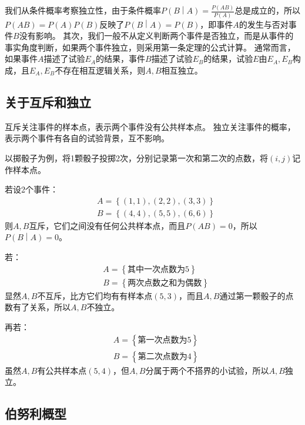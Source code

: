 我们从条件概率考察独立性，由于条件概率$P\left( B \middle| A \right) =\frac{P\left( AB \right)}{P\left( A \right)}$总是成立的，所以$P\left( AB \right) =P\left( A \right) P\left( B \right) $反映了$P\left( B \middle| A \right) =P\left( B \right) $，即事件$A$的发生与否对事件$B$没有影响。
其次，我们一般不从定义判断两个事件是否独立，而是从事件的事实角度判断，如果两个事件独立，则采用第一条定理的公式计算。
通常而言，如果事件$A$描述了试验$E_A$的结果，事件$B$描述了试验$E_B$的结果，试验$E$由$E_A,E_B$构成，且$E_A,E_B$不存在相互逻辑关系，则$A,B$相互独立。

\subsection{关于互斥和独立}

互斥关注事件的样本点，表示两个事件没有公共样本点。
独立关注事件的概率，表示两个事件有各自的试验背景，互不影响。

以掷骰子为例，将1颗骰子投掷2次，分别记录第一次和第二次的点数，将$\left( i,j\right) $记作样本点。

若设2个事件：
\begin{align*}
& A=\left\{ \left( 1,1 \right) ,\left( 2,2 \right) ,\left( 3,3 \right) \right\} \\
& B=\left\{ \left( 4,4 \right) ,\left( 5,5 \right) ,\left( 6,6 \right) \right\}
\end{align*}
则$A,B$互斥，它们之间没有任何公共样本点，而且$P\left( AB \right) =0$，所以$P\left( B \middle| A \right) =0$。

若：
\begin{align*}
& A=\left\{ \text{其中一次点数为}5 \right\} \\
& B=\left\{ \text{两次点数之和为偶数} \right\}
\end{align*}
显然$A,B$不互斥，比方它们均有有样本点$\left( 5,3 \right) $，而且$A,B$通过第一颗骰子的点数有了关系，所以$A,B$不独立。

再若：
\begin{align*}
& A=\left\{ \text{第一次点数为}5 \right\} \\
& B=\left\{ \text{第二次点数为}4 \right\}
\end{align*}
虽然$A,B$有公共样本点$\left( 5,4 \right) $，但$A,B$分属于两个不搭界的小试验，所以$A,B$独立。

\subsection{伯努利概型}

